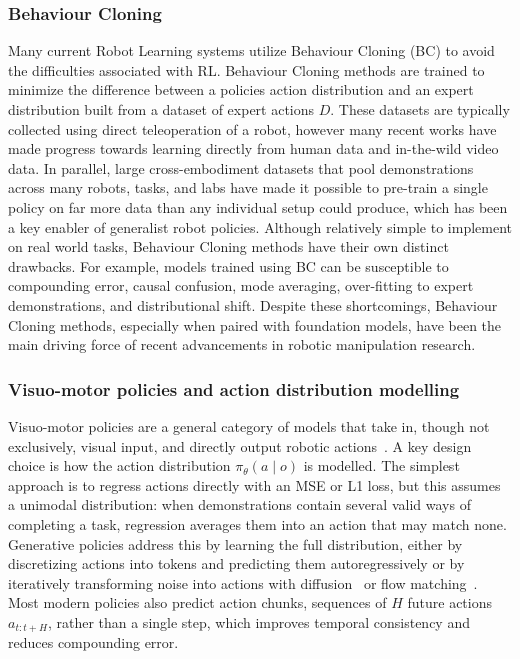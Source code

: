 
\subsubsection{Behaviour Cloning}

Many current Robot Learning systems utilize Behaviour Cloning (BC) to avoid the difficulties associated with RL. Behaviour Cloning methods are trained to minimize the difference between a policies action distribution and an expert distribution built from a dataset of expert actions $D$. These datasets are typically collected using direct teleoperation of a robot, however many recent works have made progress towards learning directly from human data and in-the-wild video data. %
In parallel, large cross-embodiment datasets that pool demonstrations across many robots, tasks, and labs have made it possible to pre-train a single policy on far more data than any individual setup could produce, which has been a key enabler of generalist robot policies. %
Although relatively simple to implement on real world tasks, Behaviour Cloning methods have their own distinct drawbacks. For example, models trained using BC can be susceptible to compounding error, causal confusion, mode averaging, over-fitting to expert demonstrations, and distributional shift. %
Despite these shortcomings, Behaviour Cloning methods, especially when paired with foundation models, have been the main driving force of recent advancements in robotic manipulation research.

\subsubsection{Visuo-motor policies and action distribution modelling}

Visuo-motor policies are a general category of models that take in, though not exclusively, visual input, and directly output robotic actions~\citep{chi2025diffusion}. A key design choice is how the action distribution $\pi_\theta(a \mid o)$ is modelled. The simplest approach is to regress actions directly with an MSE or L1 loss, but this assumes a unimodal distribution: when demonstrations contain several valid ways of completing a task, regression averages them into an action that may match none. Generative policies address this by learning the full distribution, either by discretizing actions into tokens and predicting them autoregressively %
or by iteratively transforming noise into actions with diffusion~\citep{chi2025diffusion} or flow matching~\citep{lipman2023flow}. Most modern policies also predict action chunks, sequences of $H$ future actions $a_{t:t+H}$, rather than a single step, which improves temporal consistency and reduces compounding error. %

